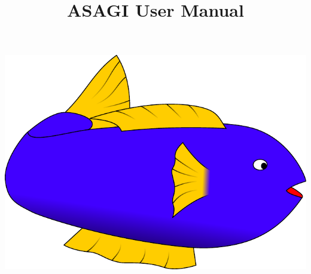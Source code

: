 \documentclass[a4paper,10pt]{article}
\title{ASAGI User Manual}
\author{}
\begin{document}
\maketitle

% 

\vspace{4cm}
\centerline{\includegraphics[width=.3\textwidth]{images/asagi}}

\pagebreak

\tableofcontents





\end{document}
